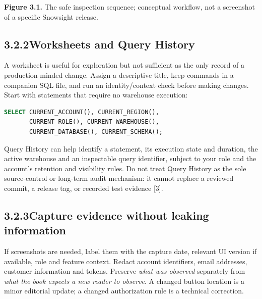\documentclass[11pt,twoside]{article}
\newcommand{\topic}[2]{\subsection*{#1\quad #2}}
\begin{document}
\begin{center}
\end{center}
{\small\color{inkgray}\textbf{Figure 3.1.} The safe inspection sequence; conceptual workflow, not a screenshot of a specific Snowsight release.}\par
\topic{3.2.2}{Worksheets and Query History}
A worksheet is useful for exploration but not sufficient as the only record of a production-minded change. Assign a descriptive title, keep commands in a companion SQL file, and run an identity/context check before making changes. Start with statements that require no warehouse execution:
\begin{lstlisting}[language=SQL,caption={Read-only session identification; actual result depends on your account.}]
SELECT CURRENT_ACCOUNT(), CURRENT_REGION(),
       CURRENT_ROLE(), CURRENT_WAREHOUSE(),
       CURRENT_DATABASE(), CURRENT_SCHEMA();
\end{lstlisting}
Query History can help identify a statement, its execution state and duration, the active warehouse and an inspectable query identifier, subject to your role and the account's retention and visibility rules. Do not treat Query History as the sole source-control or long-term audit mechanism: it cannot replace a reviewed commit, a release tag, or recorded test evidence [3].

\topic{3.2.3}{Capture evidence without leaking information}
If screenshots are needed, label them with the capture date, relevant UI version if available, role and feature context. Redact account identifiers, email addresses, customer information and tokens. Preserve \emph{what was observed} separately from \emph{what the book expects a new reader to observe}. A changed button location is a minor editorial update; a changed authorization rule is a technical correction.
\end{document}
